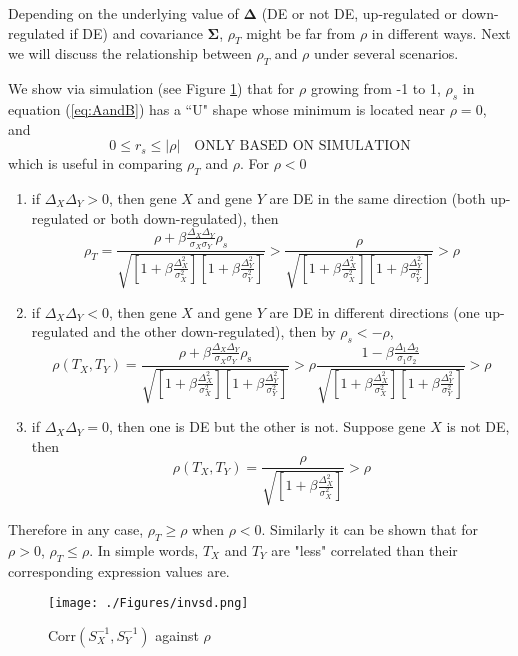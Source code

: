 \documentclass[12pt, a4paper]{article}
\newcommand{\cor}{\text{Corr}}
\begin{document}
	
	
	Depending on the underlying value of $\bm\Delta$ (DE or not DE, up-regulated or down-regulated if DE) and covariance $\bm \Sigma$,
	$\rho_T$ might be far from $\rho$ in different ways. Next we will discuss the relationship between $\rho_T$ and $\rho$ under several scenarios.
	
	We show via simulation (see Figure \ref{invsd}) that for $\rho$ growing from -1 to 1, $\rho_s$
	in equation (\ref{eq:AandB}) has a ``U" shape whose minimum is located near $\rho=0$, and  
	\begin{equation}\label{rhoineq}
		0 \leq r_s \leq |\rho| \text{~~ ONLY BASED ON SIMULATION}
	\end{equation}
	which is useful in comparing  $\rho_T$  and $\rho$. 
	For $\rho <0 $
	\begin{enumerate}
		\item if $\Delta_X\Delta_Y >0$, then gene $X$ and gene $Y$ are DE in the same direction (both 
		up-regulated or both down-regulated), then 
		\begin{equation}
			\rho_T= \frac{\rho + \beta\frac{\Delta_X\Delta_Y}{\sigma_X\sigma_Y}\rho_s}{\sqrt{ 
					\left[ 1 + \beta\frac{\Delta_X^2}{\sigma_X^2}\right]\left[ 1 + \beta\frac{\Delta_Y^2}{\sigma_Y^2}\right]}} 
			>\frac{\rho }{\sqrt{  \left[ 1 + \beta\frac{\Delta_X^2}{\sigma_X^2}\right]\left[ 1 +
					\beta\frac{\Delta_Y^2}{\sigma_Y^2}\right]}} >\rho
		\end{equation}
		\item  if $\Delta_X\Delta_Y <0$, then gene $X$ and gene $Y$ are DE in different directions (one
		up-regulated and the other down-regulated), then by $\rho_s < -\rho$, 
		\[\rho(T_X, T_Y)= \frac{\rho + \beta\frac{\Delta_X\Delta_Y}{\sigma_X\sigma_Y}\rho_{\text{s}}}{\sqrt{ 
				\left[ 1 + \beta\frac{\Delta_X^2}{\sigma_X^2}\right]\left[ 1 + \beta\frac{\Delta_Y^2}{\sigma_Y^2}\right]}} 
		>\rho\frac{ 1-\beta\frac{\Delta_1\Delta_2}{\sigma_1\sigma_2}}{\sqrt{  \left[ 1 +
				\beta\frac{\Delta_X^2}{\sigma_X^2}\right]\left[ 1 + \beta\frac{\Delta_Y^2}{\sigma_Y^2}\right]}} >\rho\]
		\item if  $\Delta_X\Delta_Y =0$, then one is DE but the other is not. Suppose gene $X$ is not DE,
		then
		\[\rho(T_X, T_Y)= \frac{\rho}{\sqrt{  \left[ 1 + \beta\frac{\Delta_X^2}{\sigma_X^2}\right]}} >\rho \]
		
	\end{enumerate}
	Therefore in any case, $\rho_T \geq \rho$ when $\rho <0$. Similarly it can be shown that for
	$\rho >0$, $\rho_T \leq \rho $. In simple words,  $T_X$ and $T_Y$ are "less" correlated than their corresponding expression values are. 
	\begin{figure}[!h]
		\centering
		\caption{$\cor(S^{-1}_X, S^{-1}_Y)$ against $\rho$}
		\texttt{[image: ./Figures/invsd.png]}
		\label{invsd}
	\end{figure}
	
\end{document}
